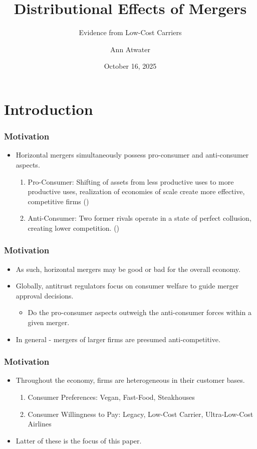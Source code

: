 \documentclass[xcolor=dvipsnames]{beamer}
\author{Ann Atwater}
\institute{University of Florida}
\title{Distributional Effects of Mergers}
\subtitle{Evidence from Low-Cost Carriers}
\date{October 16, 2025}
\begin{document}
	\section{Introduction}
	\frame{\titlepage}
    \begin{frame}
        \frametitle{Motivation}
        \begin{itemize}
            \item Horizontal mergers simultaneously possess pro-consumer and anti-consumer aspects.
            \begin{enumerate}
                \item Pro-Consumer: Shifting of assets from less productive uses to more productive uses, realization of economies of scale create more effective, competitive firms (\cite{williamson_economies_1968, farrell_horizontal_1990, kaplow_improving_2025})
                \item Anti-Consumer: Two former rivals operate in a state of perfect collusion, creating lower competition. (\cite{stigler_theory_1964})
            \end{enumerate}
        \end{itemize}
    \end{frame}

    \begin{frame}
        \frametitle{Motivation}
        \begin{itemize}
        \item As such, horizontal mergers may be good or bad for the overall economy.
            \item Globally, antitrust regulators focus on consumer welfare to guide merger approval decisions. 
            \begin{itemize}
                \item Do the pro-consumer aspects outweigh the anti-consumer forces within a given merger. 
        \end{itemize}
        \item In general - mergers of larger firms are presumed anti-competitive.
        \end{itemize}
    \end{frame}

    \begin{frame}
        \frametitle{Motivation}
        \begin{itemize}
            \item Throughout the economy, firms are heterogeneous in their customer bases.
            \begin{enumerate}
                \item Consumer Preferences: Vegan, Fast-Food, Steakhouses 
                \item Consumer Willingness to Pay: Legacy, Low-Cost Carrier, Ultra-Low-Cost Airlines
            \end{enumerate}
            \item Latter of these is the focus of this paper. 
        \end{itemize}
    \end{frame}
\end{document}
